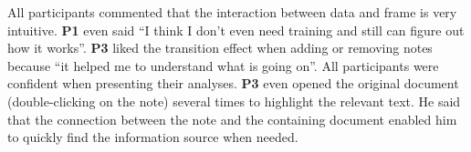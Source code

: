All participants commented that the interaction between data and frame is very intuitive. \textbf{P1} even said ``I think I don't even need training and still can figure out how it works''. \textbf{P3} liked the transition effect when adding or removing notes because ``it helped me to understand what is going on''. All participants were confident when presenting their analyses. \textbf{P3} even opened the original document (double-clicking on the note) several times to highlight the relevant text. He said that the connection between the note and the containing document enabled him to quickly find the information source when needed.